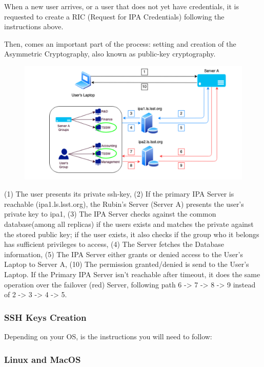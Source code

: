 When  a  new user  arrives,  or  a  user  that  does  not  yet  have  credentials, it  is  requested  to  create  a  RIC (Request for IPA Credentials) following the instructions above.

Then,  comes  an important part of the process: setting and creation of the Asymmetric Cryptography, also known as public-key cryptography.

\begin{figure}
  \includegraphics[width=13cm]{Images/example5.png}
\end{figure}

(1) The user presents its private ssh-key, (2) If the primary IPA Server is reachable (ipa1.ls.lsst.org), the
Rubin’s Server (Server A) presents the user’s private key to ipa1, (3) The IPA Server checks against the
common database(among all replicas) if the users exists and matches the private against the stored public
key; if the user exists, it also checks if the group who it belongs has sufficient privileges to access, (4) The
Server fetches the Database information, (5) The IPA Server either grants or denied access to the User’s
Laptop to Server A, (10) The permission granted/denied is send to the User’s Laptop.
If the Primary IPA Server isn’t reachable after timeout, it does the same operation over the failover (red)
Server, following path 6 -> 7 -> 8 -> 9 instead of 2 -> 3 -> 4 -> 5.

\subsubsection{SSH Keys Creation}
\label{sec:SSH:}

Depending on your OS, is the instructions you will need to follow:

\subsubsection{Linux and MacOS}
\label{sec:SSH}

